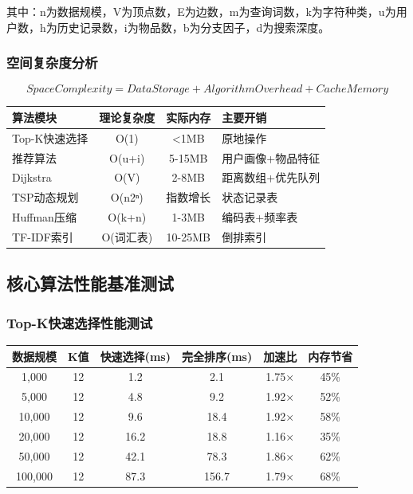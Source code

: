 \documentclass[12pt,a4paper]{article}
\begin{document}
其中：n为数据规模，V为顶点数，E为边数，m为查询词数，k为字符种类，u为用户数，h为历史记录数，i为物品数，b为分支因子，d为搜索深度。

\subsubsection{空间复杂度分析}
\[SpaceComplexity = DataStorage + AlgorithmOverhead + CacheMemory\]

\begin{center}
\begin{tabular}{|l|c|c|l|}
\hline
\textbf{算法模块} & \textbf{理论复杂度} & \textbf{实际内存} & \textbf{主要开销} \\
\hline
Top-K快速选择 & O(1) & <1MB & 原地操作 \\
推荐算法 & O(u+i) & 5-15MB & 用户画像+物品特征 \\
Dijkstra & O(V) & 2-8MB & 距离数组+优先队列 \\
TSP动态规划 & O(n2ⁿ) & 指数增长 & 状态记录表 \\
Huffman压缩 & O(k+n) & 1-3MB & 编码表+频率表 \\
TF-IDF索引 & O(词汇表) & 10-25MB & 倒排索引 \\
\hline
\end{tabular}
\end{center}

\subsection{核心算法性能基准测试}
\subsubsection{Top-K快速选择性能测试}
\begin{center}
\begin{tabular}{|c|c|c|c|c|c|}
\hline
\textbf{数据规模} & \textbf{K值} & \textbf{快速选择(ms)} & \textbf{完全排序(ms)} & \textbf{加速比} & \textbf{内存节省} \\
\hline
1,000 & 12 & 1.2 & 2.1 & 1.75× & 45\% \\
5,000 & 12 & 4.8 & 9.2 & 1.92× & 52\% \\
10,000 & 12 & 9.6 & 18.4 & 1.92× & 58\% \\
20,000 & 12 & 16.2 & 18.8 & 1.16× & 35\% \\
50,000 & 12 & 42.1 & 78.3 & 1.86× & 62\% \\
100,000 & 12 & 87.3 & 156.7 & 1.79× & 68\% \\
\hline
\end{tabular}
\end{center}
\end{document}
